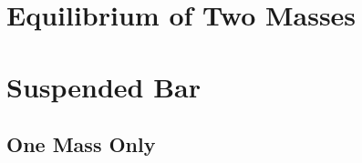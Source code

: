 \documentclass{article}
\begin{document}
\subsection{} %

\section{Equilibrium of Two Masses}

\subsection{} %



\subsection{} %



\subsection{} %



\subsection{} %




\section{Suspended Bar}

\subsection{One Mass Only}

\subsubsection{} %



\subsubsection{} %



\subsubsection{} %
\end{document}
